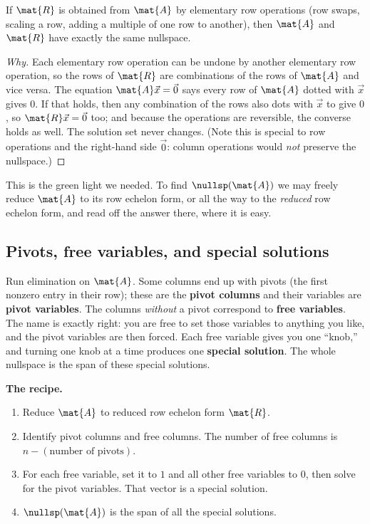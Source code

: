 \begin{lemma}\label{ch12:row-ops-preserve-null}
If $\mat{R}$ is obtained from $\mat{A}$ by elementary row operations (row swaps,
scaling a row, adding a multiple of one row to another), then $\mat{A}$ and
$\mat{R}$ have exactly the same nullspace.
\end{lemma}

\begin{proof}[Why]
Each elementary row operation can be undone by another elementary row operation,
so the rows of $\mat{R}$ are combinations of the rows of $\mat{A}$ and vice
versa. The equation $\mat{A}\vec{x}=\vec{0}$ says every row of $\mat{A}$ dotted
with $\vec{x}$ gives $0$. If that holds, then any combination of the rows also
dots with $\vec{x}$ to give $0$, so $\mat{R}\vec{x}=\vec{0}$ too; and because the
operations are reversible, the converse holds as well. The solution set never
changes. (Note this is special to row operations and the right-hand side $\vec
0$: column operations would \emph{not} preserve the nullspace.)
\end{proof}

This is the green light we needed. To find $\nullsp(\mat{A})$ we may freely reduce
$\mat{A}$ to its row echelon form, or all the way to the \emph{reduced} row
echelon form, and read off the answer there, where it is easy.

\subsection{Pivots, free variables, and special solutions}

Run elimination on $\mat{A}$. Some columns end up with pivots (the first nonzero
entry in their row); these are the \textbf{pivot columns} and their variables are
\textbf{pivot variables}. The columns \emph{without} a pivot correspond to
\textbf{free variables}. The name is exactly right: you are free to set those
variables to anything you like, and the pivot variables are then forced. Each
free variable gives you one ``knob,'' and turning one knob at a time produces one
\textbf{special solution}. The whole nullspace is the span of these special
solutions.

\begin{focusbox}
\textbf{The recipe.}
\begin{enumerate}
  \item Reduce $\mat{A}$ to reduced row echelon form $\mat{R}$.
  \item Identify pivot columns and free columns. The number of free columns is
  $n - (\text{number of pivots})$.
  \item For each free variable, set it to $1$ and all other free variables to
  $0$, then solve for the pivot variables. That vector is a special solution.
  \item $\nullsp(\mat{A})$ is the span of all the special solutions.
\end{enumerate}
\end{focusbox}

